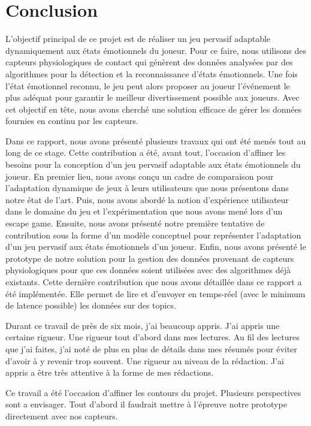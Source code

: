 \documentclass[11pt]{article}
\begin{document}
\section{Conclusion}\label{sec:conclusion}
	L'objectif principal de ce projet est de réaliser un jeu pervasif adaptable dynamiquement aux états émotionnels du joueur.
	Pour ce faire, nous utilisons des capteurs physiologiques de contact qui génèrent des données analysées par des algorithmes pour la détection et la reconnaissance d'états émotionnels.
	Une fois l'état émotionnel reconnu, le jeu peut alors proposer au joueur l'événement le plus adéquat pour garantir le meilleur divertissement possible aux joueurs.
	Avec cet objectif en tête, nous avons cherché une solution efficace de gérer les données fournies en continu par les capteurs.\par
	Dans ce rapport, nous avons présenté plusieurs travaux qui ont été menés tout au long de ce stage.
	Cette contribution a été, avant tout, l'occasion d'affiner les besoins pour la conception d'un jeu pervasif adaptable aux états émotionnels du joueur.
	En premier lieu, nous avons conçu un cadre de comparaison pour l'adaptation dynamique de jeux à leurs utilisateurs que nous présentons dans notre état de l'art.
	Puis, nous avons abordé la notion d'expérience utilisateur dans le domaine du jeu et l'expérimentation que nous avons mené lors d'un escape game.
	Ensuite, nous avons présenté notre première tentative de contribution sous la forme d'un modèle conceptuel pour représenter l'adaptation d'un jeu pervasif aux états émotionnels d'un joueur.
	Enfin, nous avons présenté le prototype de notre solution pour la gestion des données provenant de capteurs physiologiques pour que ces données soient utilisées avec des algorithmes déjà existants.
	Cette dernière contribution que nous avons détaillée dans ce rapport a été implémentée.
	Elle permet de lire et d'envoyer en temps-réel (avec le minimum de latence possible) les données sur des topics.\par
	Durant ce travail de près de six mois, j'ai beaucoup appris.
	J'ai appris une certaine rigueur.
	Une rigueur tout d'abord dans mes lectures.
	Au fil des lectures que j'ai faites, j'ai noté de plus en plus de détails dans mes résumés pour éviter d'avoir à y revenir trop souvent.
	Une rigueur au niveau de la rédaction.
	J'ai appris a être très attentive à la forme de mes rédactions.\par
	Ce travail a été l'occasion d'affiner les contours du projet.
	Plusieurs perspectives sont a envisager.
	Tout d'abord il faudrait mettre à l'épreuve notre prototype directement avec nos capteurs.
\end{document}
